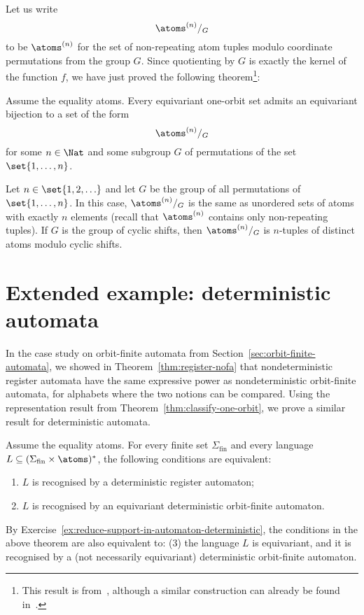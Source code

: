  Let us write
$$\atoms^{(n)} /_G$$ to be $\atoms^{(n)}$
for the set of non-repeating atom tuples modulo coordinate permutations from the group $G$. Since quotienting by $G$ is exactly the kernel of the function $f$, we have just proved the following theorem\footnote{This result is from~\cite[Theorem 10.17]{DBLP:journals/corr/BojanczykKL14}, although a similar construction can already be found in~\cite[Definition 2]{DBLP:conf/fossacs/FerrariMP02}. 
}:
\begin{theorem} \label{thm:classify-one-orbit}Assume the equality atoms.
Every equivariant one-orbit set admits an equivariant bijection to a set of the form $$\atoms^{(n)} /_G$$ for some $n \in \Nat$ and some subgroup $G$ of permutations of the set $\set{1,\ldots,n}$.
 
\end{theorem}
\begin{myexample}
 Let $n \in \set{1,2,\ldots}$ and let $G$ be the group of all permutations of $\set{1,\ldots,n}$. In this case, $\atoms^{(n)} /_G$ is the same as unordered sets of atoms with exactly $n$ elements (recall that $\atoms^{(n)}$ contains only non-repeating tuples). If $G$ is the group of cyclic shifts, then $\atoms^{(n)} /_G$ is $n$-tuples of distinct atoms modulo cyclic shifts. 
\end{myexample}


\exercisepart



\section{Extended example: deterministic automata}
\label{sec:det-reg-are-of}
In the case study on orbit-finite automata from Section~\ref{sec:orbit-finite-automata}, we showed in Theorem~\ref{thm:register-nofa} that nondeterministic register automata have the same expressive power as nondeterministic orbit-finite automata, for alphabets where the two notions can be compared. Using the representation result from Theorem~\ref{thm:classify-one-orbit}, we prove a similar result for deterministic automata. 
\begin{theorem}\label{thm:register-dofa}
 Assume the equality atoms. For every finite set $\Sigma_{\mathrm{fin}}$ and every language $L \subseteq (\Sigma_{\mathrm{fin}} \times \atoms)^*$, the following conditions are equivalent:
	\begin{enumerate}
		\item \label{it:rec-reg-dofa} $L$ is recognised by a deterministic register automaton;
		\item \label{it:rec-dofa} $L$ is recognised by an equivariant deterministic orbit-finite automaton.
	\end{enumerate}
\end{theorem}
By Exercise~\ref{ex:reduce-support-in-automaton-deterministic}, the conditions in the above theorem are also equivalent to: (3) the language $L$ is equivariant, and it is recognised by a (not necessarily equivariant) deterministic orbit-finite automaton. 

